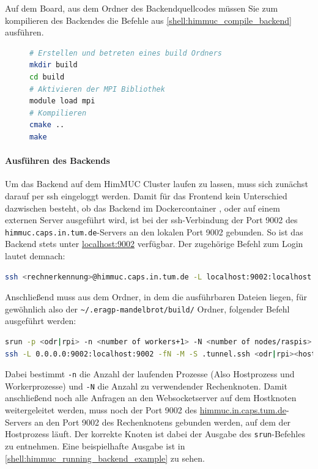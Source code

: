 Auf dem Board, aus dem Ordner des Backendquellcodes müssen Sie zum kompilieren
des Backendes die Befehle aus \autoref{shell:himmuc_compile_backend} ausführen.

\begin{figure}[h!]
	\begin{lstlisting}[language=bash, caption={Kompilieren des Backends}, label={shell:himmuc_compile_backend}]
# Erstellen und betreten eines build Ordners
mkdir build
cd build
# Aktivieren der MPI Bibliothek
module load mpi
# Kompilieren
cmake ..
make
    \end{lstlisting}
\end{figure}


\paragraph{Ausführen des Backends}\label{par:himmuc_run_backend}

Um das Backend auf dem HimMUC Cluster laufen zu lassen, muss sich zunächst darauf per ssh eingeloggt werden.
Damit für das Frontend kein Unterschied dazwischen besteht, ob das Backend im Dockercontainer , oder
auf einem externen Server ausgeführt wird, ist bei der ssh-Verbindung der Port 9002
des \verb|himmuc.caps.in.tum.de|-Servers an den lokalen Port 9002 gebunden.
So ist das Backend stets unter \url{localhost:9002} verfügbar.
Der zugehörige Befehl zum Login lautet demnach:

\begin{lstlisting}[language=bash]
ssh <rechnerkennung>@himmuc.caps.in.tum.de -L localhost:9002:localhost:9002
\end{lstlisting}

Anschließend muss aus dem Ordner, in dem die ausführbaren Dateien liegen,
für gewöhnlich also der \verb|~/.eragp-mandelbrot/build/| Ordner,
folgender Befehl ausgeführt werden:

\begin{lstlisting}[language=bash]
srun -p <odr|rpi> -n <number of workers+1> -N <number of nodes/raspis> -l --multi-prog <path to eragp-mandelbrot/backend>/himmuc/run.conf &
ssh -L 0.0.0.0:9002:localhost:9002 -fN -M -S .tunnel.ssh <odr|rpi><host number>
\end{lstlisting}

Dabei bestimmt \verb|-n| die Anzahl der laufenden Prozesse (Also Hostprozess und Workerprozesse)
und \verb|-N| die Anzahl zu verwendender Rechenknoten.
Damit anschließend noch alle Anfragen an den Websocketserver auf dem Hostknoten weitergeleitet werden,
muss noch der Port 9002 des \url{himmuc.in.caps.tum.de}-Servers an den Port 9002 des Rechenknotens gebunden werden,
auf dem der Hostprozess läuft.
Der korrekte Knoten ist dabei der Ausgabe des \verb|srun|-Befehles zu entnehmen.
Eine beispielhafte Ausgabe ist in \autoref{shell:himmuc_running_backend_example} zu sehen.

